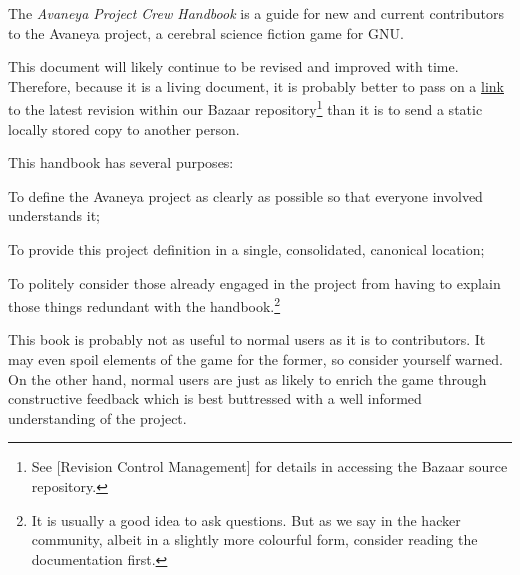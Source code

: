 

The {\it Avaneya Project Crew Handbook} is a guide for new and current contributors to the Avaneya project, a cerebral science fiction game for GNU. 

This document will likely continue to be revised and improved with time. Therefore, because it is a living document, it is probably better to pass on a \href{http://bazaar.launchpad.net/~avaneya/avaneya/trunk/view/head:/Documentation/Contributors/Handbook/Avaneya\%20Project\%20Crew\%20Handbook.pdf}{link} to the latest revision within our Bazaar repository\footnote[]{See [Revision Control Management] for details in accessing the Bazaar source repository.} than it is to send a static locally stored copy to another person.

This handbook has several purposes:

\startitemize[R]
\item
To define the Avaneya project as clearly as possible so that everyone involved understands it;

\item
To provide this project definition in a single, consolidated, canonical location;

\item
To politely consider those already engaged in the project from having to explain those things redundant with the handbook.\footnote[rtfm]{It is usually a good idea to ask questions. But as we say in the hacker community, albeit in a slightly more colourful form, consider reading the documentation first.}
\stopitemize

This book is probably not as useful to normal users as it is to contributors. It may even spoil elements of the game for the former, so consider yourself warned. On the other hand, normal users are just as likely to enrich the game through constructive feedback which is best buttressed with a well informed understanding of the project.

\StopChapter

